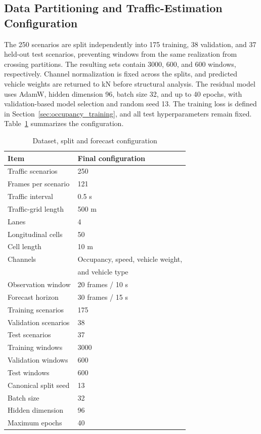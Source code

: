 \documentclass[journal]{IEEEtran}
\begin{document}
\subsection{Data Partitioning and Traffic-Estimation Configuration}

The 250 scenarios are split independently into 175 training, 38 validation, and 37 held-out test scenarios, preventing windows from the same realization from crossing partitions. The resulting sets contain 3000, 600, and 600 windows, respectively. Channel normalization is fixed across the splits, and predicted vehicle weights are returned to kN before structural analysis. The residual model uses AdamW, hidden dimension 96, batch size 32, and up to 40 epochs, with validation-based model selection and random seed 13. The training loss is defined in Section~\ref{sec:occupancy_training}, and all test hyperparameters remain fixed. Table~\ref{tab:dataset_configuration} summarizes the configuration.

\begin{table}[!htbp]
\centering
\caption{Dataset, split and forecast configuration}
\label{tab:dataset_configuration}
\footnotesize
\begin{tabular}{ll}
\toprule
\textbf{Item} & \textbf{Final configuration} \\
\midrule
Traffic scenarios       & 250 \\
Frames per scenario     & 121 \\
Traffic interval        & 0.5 s \\
Traffic-grid length     & 500 m \\
Lanes                   & 4 \\
Longitudinal cells      & 50 \\
Cell length             & 10 m \\
Channels                & Occupancy, speed, vehicle weight, \\
                        & and vehicle type \\
Observation window      & 20 frames / 10 s \\
Forecast horizon        & 30 frames / 15 s \\
Training scenarios      & 175 \\
Validation scenarios    & 38 \\
Test scenarios          & 37 \\
Training windows        & 3000 \\
Validation windows      & 600 \\
Test windows            & 600 \\
Canonical split seed    & 13 \\
Batch size              & 32 \\
Hidden dimension        & 96 \\
Maximum epochs          & 40 \\
\bottomrule
\end{tabular}
\end{table}
\end{document}
